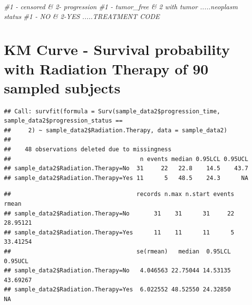 \documentclass[
  11pt,
]{article}
\newenvironment{Shaded}{\begin{snugshade}}{\end{snugshade}}
\newcommand{\AttributeTok}[1]{\textcolor[rgb]{0.77,0.63,0.00}{#1}}
\newcommand{\CommentTok}[1]{\textcolor[rgb]{0.56,0.35,0.01}{\textit{#1}}}
\newcommand{\DecValTok}[1]{\textcolor[rgb]{0.00,0.00,0.81}{#1}}
\newcommand{\FunctionTok}[1]{\textcolor[rgb]{0.00,0.00,0.00}{#1}}
\newcommand{\NormalTok}[1]{#1}
\newcommand{\OtherTok}[1]{\textcolor[rgb]{0.56,0.35,0.01}{#1}}
\newcommand{\SpecialCharTok}[1]{\textcolor[rgb]{0.00,0.00,0.00}{#1}}
\begin{document}
\begin{Shaded}
\begin{Highlighting}[]
\CommentTok{\#1 {-} censored \& 2{-} progression}
\CommentTok{\#1 {-} tumor\_free \& 2 with tumor .....neoplasm status }
\CommentTok{\#1 {-} NO \& 2{-}YES .....TREATMENT CODE}
\end{Highlighting}
\end{Shaded}

\newpage
\section{KM Curve - Survival probability with Radiation Therapy of 90 sampled subjects}

\begin{Shaded}
\end{Shaded}

\begin{verbatim}
## Call: survfit(formula = Surv(sample_data2$progression_time, sample_data2$progression_status == 
##     2) ~ sample_data2$Radiation.Therapy, data = sample_data2)
## 
##    48 observations deleted due to missingness 
##                                     n events median 0.95LCL 0.95UCL
## sample_data2$Radiation.Therapy=No  31     22   22.8    14.5    43.7
## sample_data2$Radiation.Therapy=Yes 11      5   48.5    24.3      NA
\end{verbatim}

\begin{Shaded}
\end{Shaded}

\begin{verbatim}
##                                    records n.max n.start events    rmean
## sample_data2$Radiation.Therapy=No       31    31      31     22 28.95121
## sample_data2$Radiation.Therapy=Yes      11    11      11      5 33.41254
##                                    se(rmean)   median  0.95LCL  0.95UCL
## sample_data2$Radiation.Therapy=No   4.046563 22.75044 14.53135 43.69267
## sample_data2$Radiation.Therapy=Yes  6.022552 48.52550 24.32850       NA
\end{verbatim}
\end{document}
